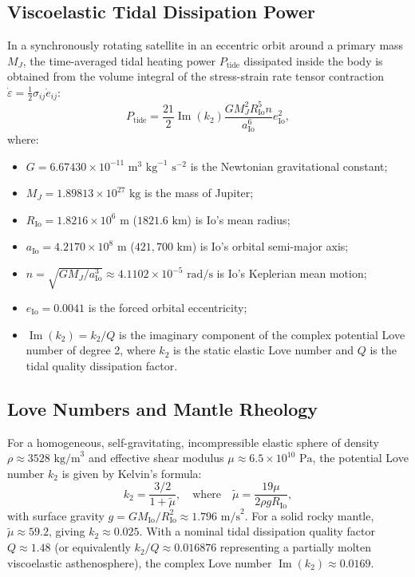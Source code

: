 \documentclass[11pt,a4paper]{article}
\begin{document}
\subsection{Viscoelastic Tidal Dissipation Power}
In a synchronously rotating satellite in an eccentric orbit around a primary mass $M_J$, the time-averaged tidal heating power $P_{\mathrm{tide}}$ dissipated inside the body is obtained from the volume integral of the stress-strain rate tensor contraction $\dot{\varepsilon} = \frac{1}{2} \sigma_{ij} \dot{e}_{ij}$:
\begin{equation}
P_{\mathrm{tide}} = \frac{21}{2} \operatorname{Im}(k_2) \frac{G M_J^2 R_{\mathrm{Io}}^5 n}{a_{\mathrm{Io}}^6} e_{\mathrm{Io}}^2,
\label{eq:ptide}
\end{equation}
where:
\begin{itemize}\setlength{\itemsep}{0pt}
    \item $G = 6.67430 \times 10^{-11}\text{ m}^3\text{ kg}^{-1}\text{ s}^{-2}$ is the Newtonian gravitational constant;
    \item $M_J = 1.89813 \times 10^{27}\text{ kg}$ is the mass of Jupiter;
    \item $R_{\mathrm{Io}} = 1.8216 \times 10^6\text{ m}$ ($1821.6\text{ km}$) is Io's mean radius;
    \item $a_{\mathrm{Io}} = 4.2170 \times 10^8\text{ m}$ ($421,700\text{ km}$) is Io's orbital semi-major axis;
    \item $n = \sqrt{G M_J / a_{\mathrm{Io}}^3} \approx 4.1102 \times 10^{-5}\text{ rad/s}$ is Io's Keplerian mean motion;
    \item $e_{\mathrm{Io}} = 0.0041$ is the forced orbital eccentricity;
    \item $\operatorname{Im}(k_2) = k_2 / Q$ is the imaginary component of the complex potential Love number of degree 2, where $k_2$ is the static elastic Love number and $Q$ is the tidal quality dissipation factor.
\end{itemize}

\subsection{Love Numbers and Mantle Rheology}
For a homogeneous, self-gravitating, incompressible elastic sphere of density $\rho \approx 3528\text{ kg/m}^3$ and effective shear modulus $\mu \approx 6.5 \times 10^{10}\text{ Pa}$, the potential Love number $k_2$ is given by Kelvin's formula:
\begin{equation}
k_2 = \frac{3/2}{1 + \tilde{\mu}}, \quad \text{where} \quad \tilde{\mu} = \frac{19 \mu}{2 \rho g R_{\mathrm{Io}}},
\end{equation}
with surface gravity $g = G M_{\mathrm{Io}} / R_{\mathrm{Io}}^2 \approx 1.796\text{ m/s}^2$. For a solid rocky mantle, $\tilde{\mu} \approx 59.2$, giving $k_2 \approx 0.025$. With a nominal tidal dissipation quality factor $Q \approx 1.48$ (or equivalently $k_2/Q \approx 0.016876$ representing a partially molten viscoelastic asthenosphere), the complex Love number $\operatorname{Im}(k_2) \approx 0.0169$.
\end{document}
